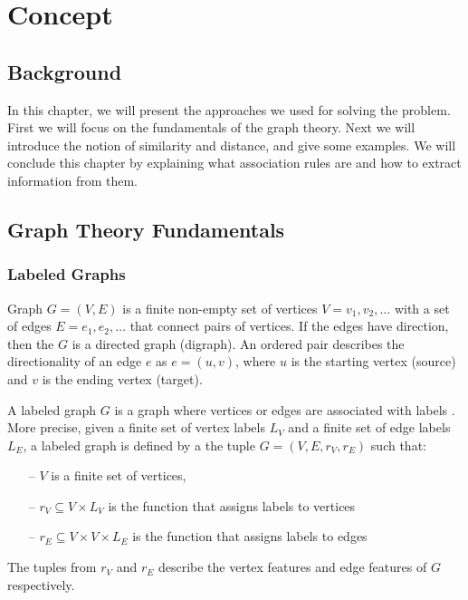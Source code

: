 
\chapter{Concept} \label{chap:Concept}
\minitoc\vspace{1em}

\section{Background}
In this chapter, we will present the approaches we used for solving the problem.
First we will focus on the fundamentals of the graph theory. Next we will introduce the notion of similarity and distance, and give some examples. We will conclude this chapter by explaining what association rules are and how to extract information from them. 

\section{Graph Theory Fundamentals}
\subsection{Labeled Graphs}
Graph $G = (V,E)$ is a finite non-empty set of vertices $V = {v_{1}, v_{2}, …}$ with a set of edges $E = {e_{1}, e_{2}, …}$ that connect pairs of vertices.
If the edges have direction, then the $G$ is a directed graph (digraph). 
An ordered pair describes the directionality of an edge $e$ as $e = (u,v)$,
where $u$ is the starting vertex (source) and $v$ is the ending vertex (target). 

A labeled graph $G$ is a graph where vertices or edges are associated with labels \cite{Champin2003}. 
More precise, given a finite set of vertex labels $L_{V}$ and a finite set of edge labels $L_{E}$, a labeled graph is defined by a the tuple $G = (V, E, r_{V} , r_{E})$ such that:

\begin{itemize}
	\item[--]  $V$ is a finite set of vertices,
	\item[--] $r_{V} \subseteq V \times L_{V}$ is the function that assigns labels to vertices
	\item[--]  $r_{E} \subseteq V \times V \times L_{E}$ is the function that assigns labels to edges
\end{itemize}

The tuples from $r_{V}$ and $ r_{E} $ describe the vertex features and edge features of $G$ respectively. 

